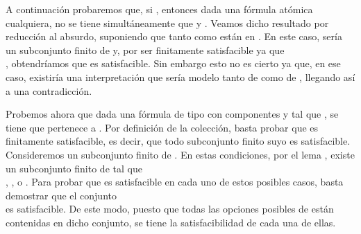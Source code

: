 \begin{isabellebody}
\begin{isamarkuptext}
\begin{demostracion}
    A continuación probaremos que, si , entonces dada  una fórmula atómica cualquiera, no 
    se tiene simultáneamente que  y . Veamos dicho resultado por reducción al 
    absurdo, suponiendo que tanto  como  están en . En este caso,  sería un
    subconjunto finito de  y, por ser  finitamente satisfacible ya que\\ , obtendríamos 
    que  es satisfacible. Sin embargo esto no es cierto ya que, en ese caso, existiría
    una interpretación que sería modelo tanto de  como de , llegando así a una 
    contradicción.

    Probemos ahora que dada una fórmula  de tipo \isa{{\isasymalpha}} con componentes  y  tal que ,
    se tiene que  pertenece a . Por definición de la colección, basta probar que 
     es finitamente satisfacible, es decir, que todo subconjunto finito suyo es
    satisfacible. Consideremos un subconjunto finito  de . En estas condiciones,
    por el lema , existe un subconjunto finito  de  tal que\\ ,
    ,  o . Para probar que  es satisfacible en cada uno de 
    estos posibles casos, basta demostrar que el conjunto\\  es satisfacible. De este
    modo, puesto que todas las opciones posibles de  están contenidas en dicho conjunto, se
    tiene la satisfacibilidad de cada una de ellas.


\end{demostracion}
\end{isamarkuptext}
\end{isabellebody}
